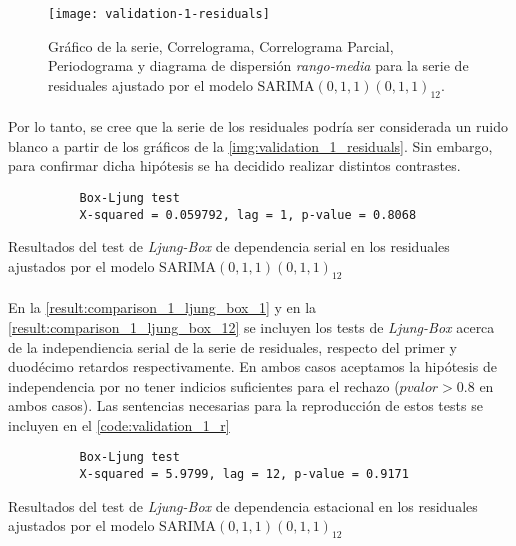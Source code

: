 \documentclass[a4paper, spanish]{article}
\begin{document}
      \begin{figure}[htb!]
        \centering
        \texttt{[image: validation-1-residuals]}
        \caption{Gráfico de la serie, Correlograma, Correlograma Parcial, Periodograma y diagrama de dispersión \emph{rango-media} para la serie de residuales ajustado por el modelo $\text{SARIMA}(0, 1, 1)(0, 1, 1)_{12}$.}
        \label{img:validation_1_residuals}
      \end{figure}

      \paragraph{}
      Por lo tanto, se cree que la serie de los residuales podría ser considerada un ruido blanco a partir de los gráficos de la \autoref{img:validation_1_residuals}. Sin embargo, para confirmar dicha hipótesis se ha decidido realizar distintos contrastes.

      \begin{table}[htb!]
        \begin{Verbatim}
          Box-Ljung test
          X-squared = 0.059792, lag = 1, p-value = 0.8068
        \end{Verbatim}
        \caption{Resultados del test de \emph{Ljung-Box} de dependencia serial en los residuales ajustados por el modelo $\text{SARIMA}(0, 1, 1)(0, 1, 1)_{12}$}
        \label{result:comparison_1_ljung_box_1}
      \end{table}

      \paragraph{}
      En la \autoref{result:comparison_1_ljung_box_1} y en la \autoref{result:comparison_1_ljung_box_12} se incluyen los tests de \emph{Ljung-Box} acerca de la independiencia serial de la serie de residuales, respecto del primer y duodécimo retardos respectivamente. En ambos casos aceptamos la hipótesis de independencia por no tener indicios suficientes para el rechazo ($pvalor > 0.8$ en ambos casos). Las sentencias necesarias para la reproducción de estos tests se incluyen en el \autoref{code:validation_1_r}

      \begin{table}[htb!]
        \begin{Verbatim}
          Box-Ljung test
          X-squared = 5.9799, lag = 12, p-value = 0.9171
        \end{Verbatim}
        \caption{Resultados del test de \emph{Ljung-Box} de dependencia estacional en los residuales ajustados por el modelo $\text{SARIMA}(0, 1, 1)(0, 1, 1)_{12}$}
        \label{result:comparison_1_ljung_box_12}
      \end{table}
\end{document}
